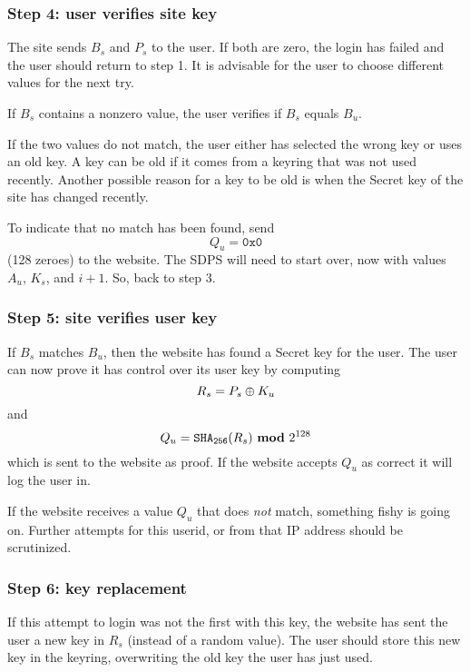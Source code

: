 \subsubsection{Step 4: user verifies site key}
\label{sec:login_step4}
The site sends $B_s$ and $P_s$ to the user.
If both are zero, the login has failed and the user should return to step 1.
It is advisable for the user to choose different values for the next try.
\par
If $B_s$ contains a nonzero value, the user verifies if $B_s$ equals $B_u$.
\par
If the two values do not match, the user either has selected the wrong key or uses an old key.
A key can be old if it comes from a keyring that was not used recently.
Another possible reason for a key to be old is when the Secret key of the site has changed recently.
\par
To indicate that no match has been found, send
\[Q_u=\mathtt{0x0}\]
(128 zeroes) to the website.
The SDPS will need to start over, now with values $A_u$, $K_s$, and $i+1$.
So, back to step 3.

\subsubsection{Step 5: site verifies user key}
\label{sec:login_step5}
If $B_s$ matches $B_u$, then the website has found a Secret key for the user.
The user can now prove it has control over its user key by computing
\[R_s=P_s\oplus K_u\]
and
\[Q_u=\texttt{\ensuremath{\mathtt{SHA_{256}}}}(R_s)\ \textbf{mod}\ 2^{128}\]
which is sent to the website as proof.
If the website accepts $Q_u$ as correct it will log the user in.
\par
If the website receives a value $Q_u$ that does \emph{not} match,
something fishy is going on.
Further attempts for this userid, or from that IP address should be scrutinized.

\subsubsection{Step 6: key replacement}
\label{sec:login_step6}
If this attempt to login was not the first with this key,
the website has sent the user a new key in $R_s$ (instead of a random value).
The user should store this new key in the keyring, overwriting the old key the user has just used.

